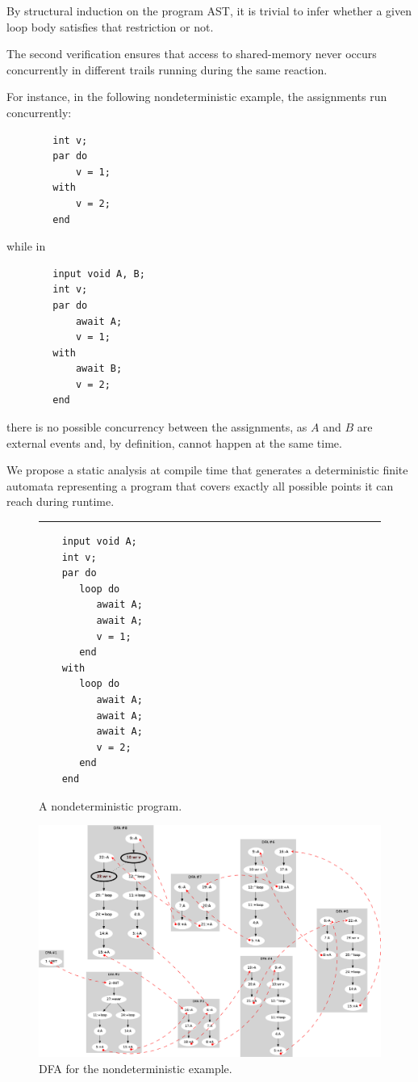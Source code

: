 \documentclass[pdftex,12pt,a4paper]{article}
\begin{document}
By structural induction on the program AST, it is trivial to infer whether a 
given loop body satisfies that restriction or not.

The second verification ensures that access to shared-memory never occurs 
concurrently in different trails running during the same reaction.

For instance, in the following nondeterministic example, the assignments run 
concurrently:
{\small
\begin{verbatim}
        int v;
        par do
            v = 1;
        with
            v = 2;
        end
\end{verbatim}
}
while in
{\small
\begin{verbatim}
        input void A, B;
        int v;
        par do
            await A;
            v = 1;
        with
            await B;
            v = 2;
        end
\end{verbatim}
}
there is no possible concurrency between the assignments, as $A$ and $B$ are 
external events and, by definition, cannot happen at the same time.

We propose a static analysis at compile time that generates a deterministic 
finite automata representing a program that covers exactly all possible points 
it can reach during runtime.

\begin{figure}[t]
\rule{8.5cm}{0.37pt}
{\small
\begin{verbatim}
    input void A;
    int v;
    par do
       loop do
          await A;
          await A;
          v = 1;
       end
    with
       loop do
          await A;
          await A;
          await A;
          v = 2;
       end
    end
\end{verbatim}
}
\caption{ A nondeterministic program.
\label{lst:ceu:det}
}
\end{figure}

\begin{figure}[t]
\centering
\includegraphics[scale=0.23]{dfa.png}
\caption{ DFA for the nondeterministic example.
\label{fig:dfa}
}
\end{figure}
\end{document}
